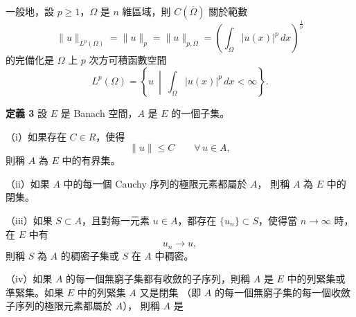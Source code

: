 \documentclass[11pt,a4paper,twoside]{article}
\newif\ifstudynotes
\newcommand{\StudyNote}[2]{%
    \ifstudynotes
    \begin{studyNote}[title={#1}]
    #2
    \end{studyNote}
    \fi
}
\newcommand{\pnum}[1]{%
    \makebox[0pt][r]{%
        \scriptsize\textbf{[#1]}\hspace{0.7em}%
    }%
}
\begin{document}
一般地，設 $p\geq 1$，$\Omega$ 是 $n$ 維區域，則
$C(\overline{\Omega})$ 關於範數
\[
    \|u\|_{L^p(\Omega)}
    =
    \|u\|_p
    =
    \|u\|_{p,\Omega}
    =
    \left(
    \int_{\Omega}|u(x)|^p\,dx
    \right)^{\frac1p}
\]
的完備化是 $\Omega$ 上 $p$ 次方可積函數空間
\[
    L^p(\Omega)
    =
    \left\{
    u\ \middle|\
    \int_{\Omega}|u(x)|^p\,dx<\infty
    \right\}.
\]
\StudyNote{複習註解：有界、閉、稠密、列緊與緊集}{
    這幾個概念都是在描述 Banach 空間中「集合」的性質。

    \textbf{有界：}
    存在固定常數 $C$，使每個 $u\in A$ 都滿足 $\|u\|\le C$。
    直覺上，整個集合可以被某個有限大小的球包住。

    \textbf{閉：}
    集合不會漏掉自己的極限。
    若 $A$ 中的序列收斂，而極限仍屬於 $A$，就表示極限沒有跑出集合。

    \textbf{稠密：}
    若 $S\subset A$，而 $A$ 中每個元素都能被 $S$ 中的序列逼近，
    則稱 $S$ 在 $A$ 中稠密。
    典型直覺是用較簡單的元素逼近較一般的元素。

    \textbf{列緊：}
    從集合中的任意無窮序列（或無窮子集）中，
    都能抽出一個收斂子序列。
    原序列本身不必收斂，重點是「可以抽出收斂的部分」。

    \textbf{緊集：}
    依本書目前的定義，可以記成
    \[
        \boxed{
            \text{緊集}
            =
            \text{列緊}
            +
            \text{閉}
        }.
    \]

    這些概念之後在存在性證明、變分法與 PDE 中會反覆出現。
}
\noindent
\pnum{46}
\textbf{定義 3}\quad
設 $E$ 是 Banach 空間，$A$ 是 $E$ 的一個子集。

\noindent
（i）如果存在 $C\in R$，使得
\[
    \|u\|\leq C
    \qquad
    \forall\,u\in A,
\]
則稱 $A$ 為 $E$ 中的有界集。

\noindent
（ii）如果 $A$ 中的每一個 Cauchy 序列的極限元素都屬於 $A$，
則稱 $A$ 為 $E$ 中的閉集。

\noindent
（iii）如果 $S\subset A$，且對每一元素 $u\in A$，都存在
$\{u_n\}\subset S$，使得當 $n\to\infty$ 時，在 $E$ 中有
\[
    u_n\to u,
\]
則稱 $S$ 為 $A$ 的稠密子集或 $S$ 在 $A$ 中稠密。

\noindent
（iv）如果 $A$ 的每一個無窮子集都有收斂的子序列，則稱 $A$ 是 $E$
中的列緊集或準緊集。如果 $E$ 中的列緊集 $A$ 又是閉集
（即 $A$ 的每一個無窮子集的每一個收斂子序列的極限元素都屬於 $A$），
則稱 $A$ 是

\newpage
\end{document}

